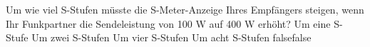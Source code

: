     {Um wie viel S-Stufen müsste die S-Meter-Anzeige Ihres Empfängers steigen, wenn Ihr Funkpartner die Sendeleistung von 100 W auf 400 W erhöht?}
    {Um eine S-Stufe}
    {Um zwei S-Stufen}
    {Um vier S-Stufen}
    {Um acht S-Stufen}
    {false}{false}